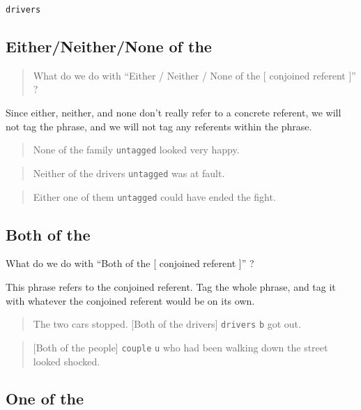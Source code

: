 \documentclass[
]{book}
\begin{document}
\texttt{drivers}

\hypertarget{eitherneithernone-of-the}{%
\subsection{Either/Neither/None of the}\label{eitherneithernone-of-the}}

\begin{quote}
What do we do with ``Either / Neither / None of the {[} conjoined referent {]}'' ?
\end{quote}

Since either, neither, and none don't really refer to a concrete referent, we will not tag the phrase,
and we will not tag any referents within the phrase.

\begin{quote}
None of the family \texttt{untagged} looked very happy.
\end{quote}

\begin{quote}
Neither of the drivers \texttt{untagged} was at fault.
\end{quote}

\begin{quote}
Either one of them \texttt{untagged} could have ended the fight.
\end{quote}

\hypertarget{both-of-the}{%
\subsection{Both of the}\label{both-of-the}}

What do we do with ``Both of the {[} conjoined referent {]}'' ?

This phrase refers to the conjoined referent. Tag the whole phrase, and tag it with whatever the conjoined referent would be on its own.

\begin{quote}
The two cars stopped.
{[}Both of the drivers{]} \texttt{drivers} \texttt{b} got out.
\end{quote}

\begin{quote}
{[}Both of the people{]} \texttt{couple} \texttt{u} who had been walking down the street looked shocked.
\end{quote}

\hypertarget{one-of-the}{%
\subsection{One of the}\label{one-of-the}}
\end{document}
